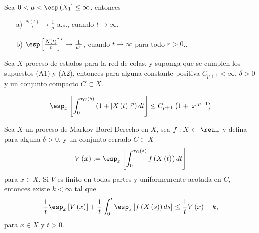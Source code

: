 \begin{Teo}\label{Tma.5.1.Gut} Sea
$0<\mu<\esp\left(X_{1}\right]\leq\infty$. entonces

\begin{itemize}
\item[a)] $\frac{N\left(t\right)}{t}\rightarrow\frac{1}{\mu}$
a.s., cuando $t\rightarrow\infty$.


\item[b)]$\esp\left[\frac{N\left(t\right)}{t}\right]^{r}\rightarrow\frac{1}{\mu^{r}}$,
cuando $t\rightarrow\infty$ para todo $r>0$..
\end{itemize}
\end{Teo}


\begin{Prop}
Sea $X$ proceso de estados para la red de colas, y suponga que se
cumplen los supuestos (A1) y (A2), entonces para alguna constante
positiva $C_{p+1}<\infty$, $\delta>0$ y un conjunto compacto
$C\subset X$.

\begin{equation}\label{Eq.5.4}
\esp_{x}\left[\int_{0}^{\tau_{C}\left(\delta\right)}\left(1+|X\left(t\right)|^{p}\right)dt\right]\leq
C_{p+1}\left(1+|x|^{p+1}\right)
\end{equation}
\end{Prop}

\begin{Prop}
Sea $X$ un proceso de Markov Borel Derecho en $X$, sea
$f:X\leftarrow\rea_{+}$ y defina para alguna $\delta>0$, y un
conjunto cerrado $C\subset X$
\[V\left(x\right):=\esp_{x}\left[\int_{0}^{\tau_{C}\left(\delta\right)}f\left(X\left(t\right)\right)dt\right]\]
para $x\in X$. Si $V$ es finito en todas partes y uniformemente
acotada en $C$, entonces existe $k<\infty$ tal que
\begin{equation}\label{Eq.5.11}
\frac{1}{t}\esp_{x}\left[V\left(x\right)\right]+\frac{1}{t}\int_{0}^{t}\esp_{x}\left[f\left(X\left(s\right)\right)ds\right]\leq\frac{1}{t}V\left(x\right)+k,
\end{equation}
para $x\in X$ y $t>0$.
\end{Prop}



